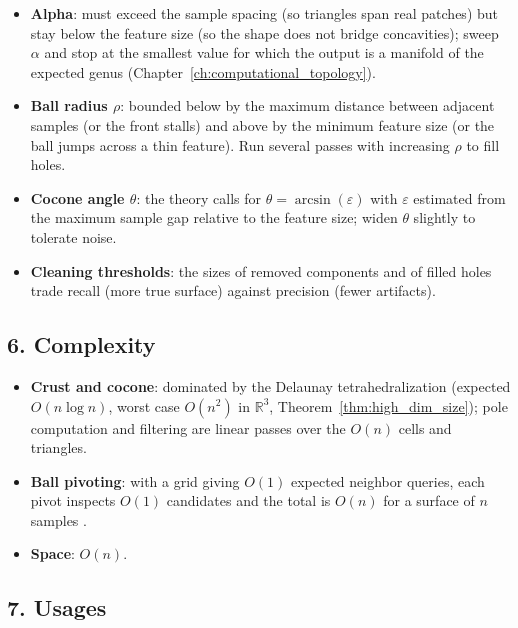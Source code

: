 \begin{itemize}
  \item \textbf{Alpha}: must exceed the sample spacing (so triangles span real
    patches) but stay below the feature size (so the shape does not bridge
    concavities); sweep $\alpha$ and stop at the smallest value for which the
    output is a manifold of the expected genus
    (Chapter~\ref{ch:computational_topology}).
  \item \textbf{Ball radius $\rho$}: bounded below by the maximum distance
    between adjacent samples (or the front stalls) and above by the minimum
    feature size (or the ball jumps across a thin feature). Run several passes
    with increasing $\rho$ to fill holes.
  \item \textbf{Cocone angle $\theta$}: the theory calls for
    $\theta = \arcsin(\varepsilon)$ with $\varepsilon$ estimated from the
    maximum sample gap relative to the feature size; widen $\theta$ slightly to
    tolerate noise.
  \item \textbf{Cleaning thresholds}: the sizes of removed components and of
    filled holes trade recall (more true surface) against precision (fewer
    artifacts).
\end{itemize}

\subsection{6. Complexity}

\begin{itemize}
  \item \textbf{Crust and cocone}: dominated by the Delaunay tetrahedralization
    (expected $O(n \log n)$, worst case $O(n^2)$ in $\mathbb{R}^3$,
    Theorem~\ref{thm:high_dim_size}); pole computation and filtering are linear
    passes over the $O(n)$ cells and triangles.
  \item \textbf{Ball pivoting}: with a grid giving $O(1)$ expected neighbor
    queries, each pivot inspects $O(1)$ candidates and the total is $O(n)$ for
    a surface of $n$ samples \cite{bernardini1999}.
  \item \textbf{Space}: $O(n)$.
\end{itemize}

\subsection{7. Usages}

